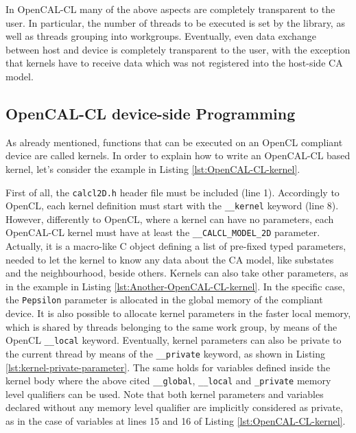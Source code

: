 In OpenCAL-CL many of the above aspects are completely transparent to
the user. In particular, the number of threads to be executed is set
by the library, as well as threads grouping into
workgroups. Eventually, even data exchange between host and device is
completely transparent to the user, with the exception that kernels have
to receive data which was not registered into the host-side CA model.



\subsection{OpenCAL-CL device-side Programming}

As already mentioned, functions that can be executed on an OpenCL
compliant device are called kernels. In order to explain how to write
an OpenCAL-CL based kernel, let's consider the example in Listing
\ref{lst:OpenCAL-CL-kernel}.

First of all, the \verb'calcl2D.h' header file must be included (line
1). Accordingly to OpenCL, each kernel definition must start with the
\verb'__kernel' keyword (line 8). However, differently to OpenCL,
where a kernel can have no parameters, each OpenCAL-CL kernel must
have at least the \verb'__CALCL_MODEL_2D' parameter. Actually, it is a
macro-like C object defining a list of pre-fixed typed parameters,
needed to let the kernel to know any data about the CA model, like
substates and the neighbourhood, beside others. Kernels can also take other
parameters, as in the example in Listing
\ref{lst:Another-OpenCAL-CL-kernel}. In the specific case, the
\verb'Pepsilon' parameter is allocated in the global memory of the
compliant device. It is also possible to allocate kernel parameters in
the faster local memory, which is shared by threads belonging to the
same work group, by means of the OpenCL \verb'__local'
keyword. Eventually, kernel parameters can also be private to the
current thread by means of the \verb'__private' keyword, as shown in
Listing \ref{lst:kernel-private-parameter}. The same holds for
variables defined inside the kernel body where the above cited
\verb'__global', \verb'__local' and \verb'_private' memory level
qualifiers can be used. Note that both kernel parameters and variables
declared without any memory level qualifier are implicitly considered
as private, as in the case of variables at lines 15 and 16 of Listing
\ref{lst:OpenCAL-CL-kernel}.

